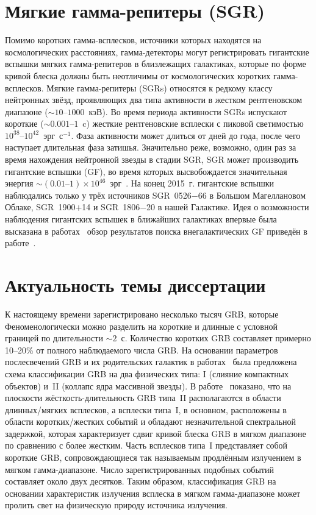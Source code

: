 \section*{Мягкие гамма-репитеры (SGR)}
Помимо коротких гамма-всплесков, источники которых находятся на космологических расстояниях,
гамма-детекторы могут регистрировать гигантские вспышки мягких гамма-репитеров 
в близлежащих галактиках, которые по форме кривой блеска должны быть неотличимы от 
космологических коротких гамма-всплесков. Мягкие гамма-репитеры (SGRs) относятся 
к редкому классу нейтронных звёзд, проявляющих 
два типа активности в жестком рентгеновском диапазоне ($\sim 10\textrm{--}1000$~кэВ). 
Во время периода активности SGRs испускают короткие ($\sim0.001\textrm{--}1$~c) жесткие рентгеновские всплески 
с пиковой светимостью $10^{38}\textrm{--}10^{42}$~эрг~с$^{-1}$. Фаза активности может длиться 
от дней до года, после чего наступает длительная фаза затишья. Значительно реже, 
возможно, один раз за время нахождения нейтронной звезды в стадии SGR, SGR может 
производить гигантские вспышки (GF), во время которых высвобождается значительная 
энергия $\sim(0.01\textrm{--}1)\times 10^{46}$~эрг~\citep[см. обзор][]{Mereghetti2013}.
На конец 2015~г. гигантские вспышки наблюдались только у трёх источников 
SGR~0526$-$66 в Большом Магеллановом Облаке, SGR~1900$+$14 и SGR~1806$-$20 в нашей Галактике.
Идея о возможности наблюдения гигантских вспышек в ближайших галактиках впервые была высказана 
в работах~\citep{Mazets1981,Mazets1982} обзор результатов поиска 
внегалактических GF приведён в работе~\citep{Hurley2011}.

\section*{Актуальность темы диссертации}
К настоящему времени зарегистрировано несколько тысяч GRB, которые
Феноменологически можно разделить на короткие и длинные с условной 
границей по длительности $\sim 2$~с. 
Количество коротких GRB составляет примерно 10--20\% от полного наблюдаемого числа GRB.
На основании параметров послесвечений GRB и их родительских галактик в 
работах~\citep{Zhang_2006,Zhang_2009} была предложена 
схема классификации GRB на два физических типа: I (слияние компактных объектов) 
и~II (коллапс ядра массивной звезды). В работе~\citep{Zhang_2009} показано,
что на плоскости жёсткость-длительность GRB типа~II располагаются в области 
длинных/мягких всплесков, а всплески типа~I, в основном, расположены в области коротких/жестких 
событий и обладают незначительной спектральной задержкой, 
которая характеризует сдвиг кривой блеска GRB в мягком диапазоне по сравнению с более жестким.
Часть всплесков типа~I представляет собой короткие GRB, сопровождающиеся так 
называемым продлённым излучением в мягком гамма-диапазоне.
Число зарегистрированных подобных событий составляет около двух десятков.
Таким образом, классификация GRB на основании характеристик излучения всплеска 
в мягком гамма-диапазоне может пролить свет на физическую природу источника излучения.

